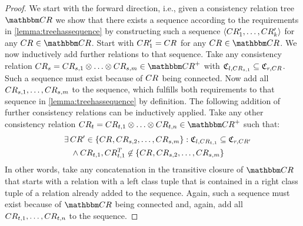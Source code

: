 \begin{proof}
    We start with the forward direction, i.e., given a consistency relation tree $\consistencyrelationset{CR}$ we show that there exists a sequence according to the requirements in \autoref{lemma:treehassequence} by constructing such a sequence $\langle CR'_{1}, \dots, CR'_{k} \rangle$ for any $\consistencyrelation{CR}{} \in \consistencyrelationset{CR}$.
    Start with $CR'_{1} = CR_{}$ for any $\consistencyrelation{CR}{} \in \consistencyrelationset{CR}$.
    We now inductively add further relations to that sequence.
    Take any consistency relation $\consistencyrelation{CR}{s} = \consistencyrelation{CR}{s,1} \concat \dots \concat \consistencyrelation{CR}{s,m} \in \transitiveclosure{\consistencyrelationset{CR}}$ with $\mathfrak{C}_{l,CR_{s,1}} \subseteq \mathfrak{C}_{r,CR_{}}$. Such a sequence must exist because of $CR_{}$ being connected.
    Now add all $CR_{s,1}, \dots, CR_{s,m}$ to the sequence, which fulfills both requirements to that sequence in \autoref{lemma:treehassequence} by definition.
    The following addition of further consistency relations can be inductively applied.
    Take any other consistency relation $\consistencyrelation{CR}{t} = \consistencyrelation{CR}{t,1} \concat \dots \concat \consistencyrelation{CR}{t,n} \in \transitiveclosure{\consistencyrelationset{CR}}$ such that:
    \begin{align*}
        \formulaskip &
        \exists \consistencyrelation{CR'}{} \in \setted{\consistencyrelation{CR}{}, \consistencyrelation{CR}{s,2}, \dots, \consistencyrelation{CR}{s,m}} :
        \classtuple{C}{l,\consistencyrelation{CR}{t,1}} \subseteq \classtuple{C}{r,\consistencyrelation{CR'}{}}\\
        & \formulaskip
        \land
        \consistencyrelation{CR}{t,1}, \consistencyrelation{CR^T}{t,1} \not\in \setted{\consistencyrelation{CR}{}, \consistencyrelation{CR}{s,2}, \dots, \consistencyrelation{CR}{s,m}}
    \end{align*}
    In other words, take any concatenation in the transitive closure of $\consistencyrelationset{CR}$ that starts with a relation with a left class tuple that is contained in a right class tuple of a relation already added to the sequence.
    Again, such a sequence must exist because of $\consistencyrelationset{CR}$ being connected and, again, add all $CR_{t,1}, \dots, CR_{t,n}$ to the sequence.

\end{proof}
